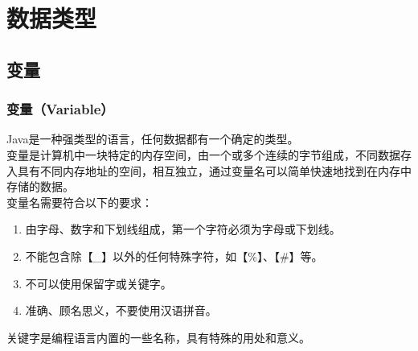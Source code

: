 \chapter{数据类型}

\section{变量}

\subsection{变量（Variable）}

Java是一种强类型的语言，任何数据都有一个确定的类型。\\

变量是计算机中一块特定的内存空间，由一个或多个连续的字节组成，不同数据存入具有不同内存地址的空间，相互独立，通过变量名可以简单快速地找到在内存中存储的数据。\\

变量名需要符合以下的要求：

\begin{enumerate}
	\item 由字母、数字和下划线组成，第一个字符必须为字母或下划线。
	\item 不能包含除【\_】以外的任何特殊字符，如【\%】、【\#】等。
	\item 不可以使用保留字或关键字。
	\item 准确、顾名思义，不要使用汉语拼音。
\end{enumerate}

关键字是编程语言内置的一些名称，具有特殊的用处和意义。

\begin{table}[H]
	\centering
	\caption{关键字}
\end{table}

